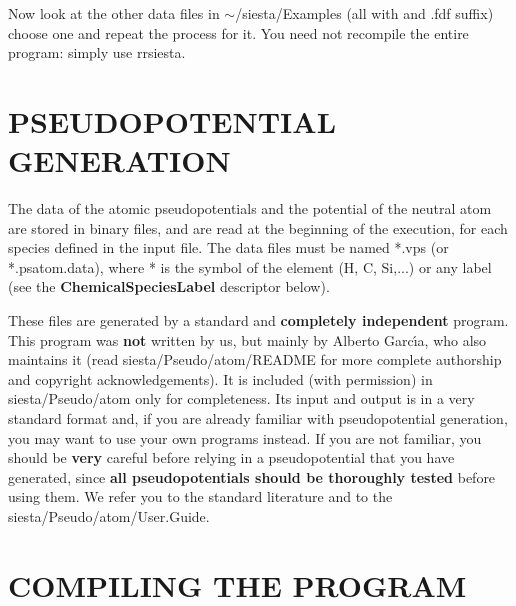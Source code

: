 Now look at the other data files in $\sim$/siesta/Examples
(all with and .fdf suffix) choose one and repeat the process for it.
You need not recompile the entire program: simply use 
rrsiesta.



\section{PSEUDOPOTENTIAL GENERATION}


The data of the atomic pseudopotentials and the potential
of the neutral atom are stored in binary files, and
are read at the beginning of the execution, for each
species defined in the input file. The data files must
be named *.vps (or *.psatom.data), where * is the symbol of the
element (H, C, Si,...) or any label (see the 
{\bf ChemicalSpeciesLabel}
descriptor below).

These files are generated by a standard and {\bf completely independent}
program. This program was {\bf not} written by us, but mainly by 
Alberto Garc\'{\i}a, who also maintains it
(read siesta/Pseudo/atom/README for more complete authorship and 
copyright acknowledgements).
It is included (with permission) in siesta/Pseudo/atom only for
completeness. Its input and output is in a very standard format and,
if you are already familiar with pseudopotential generation, you may want 
to use your own programs instead. If you are not familiar, you should
be {\bf very} careful before relying in a pseudopotential that you
have generated, since {\bf all pseudopotentials should be thoroughly
tested} before using them. We refer you to the standard literature
and to the siesta/Pseudo/atom/User.Guide.



%



\section{COMPILING THE PROGRAM}

